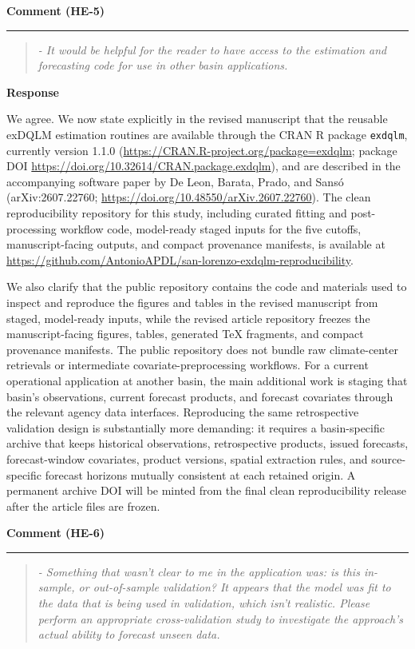 \documentclass[11pt,letterpaper]{article}
\newcommand{\commentheading}[1]{%
  \vspace{6pt}\noindent\textbf{Comment (#1)}\par
  \vspace{2pt}\hrule\vspace{6pt}
}
\newenvironment{commentblock}{\begin{quote}\small\itshape}{\end{quote}}
\newcommand{\responseheading}{%
  \vspace{2pt}\noindent\textbf{Response}\par
}
\newenvironment{responsebox}{\begin{mdframed}[style=plainbox]}{\end{mdframed}}
\newcommand{\HE}[1]{HE-#1}
\begin{document}
\commentheading{\HE{5}}
\begin{commentblock}
- It would be helpful for the reader to have access to the estimation and forecasting code for use in other basin applications.
\end{commentblock}

\responseheading
\begin{responsebox}
We agree. We now state explicitly in the revised manuscript that the reusable exDQLM estimation routines are available through the CRAN R package \texttt{exdqlm}, currently version 1.1.0 (\url{https://CRAN.R-project.org/package=exdqlm}; package DOI \url{https://doi.org/10.32614/CRAN.package.exdqlm}), and are described in the accompanying software paper by De Leon, Barata, Prado, and Sans{\'o} (arXiv:2607.22760; \url{https://doi.org/10.48550/arXiv.2607.22760}). The clean reproducibility repository for this study, including curated fitting and post-processing workflow code, model-ready staged inputs for the five cutoffs, manuscript-facing outputs, and compact provenance manifests, is available at \url{https://github.com/AntonioAPDL/san-lorenzo-exdqlm-reproducibility}.

We also clarify that the public repository contains the code and materials used to inspect and reproduce the figures and tables in the revised manuscript from staged, model-ready inputs, while the revised article repository freezes the manuscript-facing figures, tables, generated \TeX{} fragments, and compact provenance manifests. The public repository does not bundle raw climate-center retrievals or intermediate covariate-preprocessing workflows. For a current operational application at another basin, the main additional work is staging that basin's observations, current forecast products, and forecast covariates through the relevant agency data interfaces. Reproducing the same retrospective validation design is substantially more demanding: it requires a basin-specific archive that keeps historical observations, retrospective products, issued forecasts, forecast-window covariates, product versions, spatial extraction rules, and source-specific forecast horizons mutually consistent at each retained origin. A permanent archive DOI will be minted from the final clean reproducibility release after the article files are frozen.

\end{responsebox}


\commentheading{\HE{6}}
\begin{commentblock}
- Something that wasn't clear to me in the application was: is this in-sample, or out-of-sample validation? It appears that the model was fit to the data that is being used in validation, which isn't realistic. Please perform an appropriate cross-validation study to investigate the approach's actual ability to forecast unseen data.
\end{commentblock}
\end{document}
